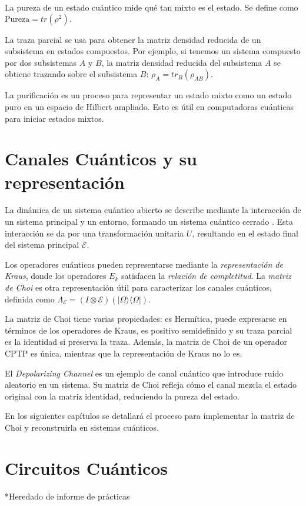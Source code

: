 \documentclass[11pt, spanish, letterpage]{report} %
\newcommand{\1}{\mathbb{1}}
\begin{document}
La pureza de un estado cuántico mide qué tan mixto es el estado. Se define como $\text{Pureza} = tr(\rho^2).$

La traza parcial se usa para obtener la matriz densidad reducida de un subsistema en estados compuestos. Por ejemplo, si tenemos un sistema compuesto por dos subsistemas $A$ y $B$, la matriz densidad reducida del subsistema $A$ se obtiene trazando sobre el subsistema $B$:
$\rho_A = tr_B(\rho_{AB}).$

La purificación es un proceso para representar un estado mixto como un estado puro en un espacio de Hilbert ampliado. Esto es útil en computadoras cuánticas para iniciar estados mixtos.



\section{Canales Cuánticos y su representación}
La dinámica de un sistema cuántico abierto se describe mediante la interacción de un sistema principal y un entorno, formando un sistema cuántico cerrado \cite{nielsen_chuang_2011}. Esta interacción se da por una transformación unitaria $U$, resultando en el estado final del sistema principal $\mathcal{E}$.

Los operadores cuánticos pueden representarse mediante la \textit{representación de Kraus}, donde los operadores ${E_k}$ satisfacen la \textit{relación de completitud}. La \textit{matriz de Choi} es otra representación útil para caracterizar los canales cuánticos, definida como $\Lambda_{\mathcal{E}} = (I \otimes \mathcal{E})(|\Omega\rangle\langle\Omega|)$.

La matriz de Choi tiene varias propiedades: es Hermítica, puede expresarse en términos de los operadores de Kraus, es positivo semidefinido y su traza parcial es la identidad si preserva la traza. Además, la matriz de Choi de un operador CPTP es única, mientras que la representación de Kraus no lo es.

El \textit{Depolarizing Channel} es un ejemplo de canal cuántico que introduce ruido aleatorio en un sistema. Su matriz de Choi refleja cómo el canal mezcla el estado original con la matriz identidad, reduciendo la pureza del estado.

En los siguientes capítulos se detallará el proceso para implementar la matriz de Choi y reconstruirla en sistemas cuánticos.
\section{Circuitos Cuánticos}
*Heredado de informe de prácticas 
\end{document}
